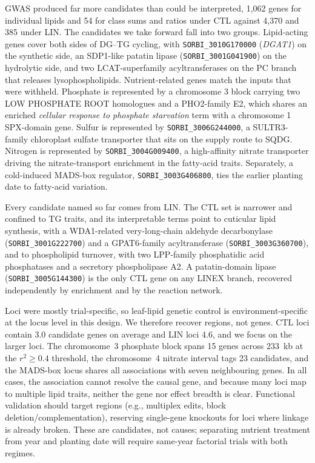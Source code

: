 \documentclass[9pt,twocolumn,twoside]{rilabRxiv}
\begin{document}
GWAS produced far more candidates than could be interpreted, 1,062 genes for individual lipids and 54 for class sums and ratios under CTL against 4,370 and 385 under LIN. The candidates we take forward fall into two groups. Lipid-acting genes cover both sides of DG--TG cycling, with \texttt{SORBI\_3010G170000} (\textit{DGAT1}) on the synthetic side, an SDP1-like patatin lipase (\texttt{SORBI\_3001G041900}) on the hydrolytic side, and two LCAT-superfamily acyltransferases on the PC branch that releases lysophospholipids. Nutrient-related genes match the inputs that were withheld. Phosphate is represented by a chromosome 3 block carrying two LOW PHOSPHATE ROOT homologues and a PHO2-family E2, which shares an enriched \textit{cellular response to phosphate starvation} term with a chromosome 1 SPX-domain gene. Sulfur is represented by \texttt{SORBI\_3006G244000}, a SULTR3-family chloroplast sulfate transporter that sits on the supply route to SQDG. Nitrogen is represented by \texttt{SORBI\_3004G009400}, a high-affinity nitrate transporter driving the nitrate-transport enrichment in the fatty-acid traits. Separately, a cold-induced MADS-box regulator, \texttt{SORBI\_3003G406800}, ties the earlier planting date to fatty-acid variation.

Every candidate named so far comes from LIN. The CTL set is narrower and confined to TG traits, and its interpretable terms point to cuticular lipid synthesis, with a WDA1-related very-long-chain aldehyde decarbonylase (\texttt{SORBI\_3001G222700}) and a GPAT6-family acyltransferase (\texttt{SORBI\_3003G360700}), and to phospholipid turnover, with two LPP-family phosphatidic acid phosphatases and a secretory phospholipase A2. A patatin-domain lipase (\texttt{SORBI\_3005G144300}) is the only CTL gene on any LINEX branch, recovered independently by enrichment and by the reaction network.

Loci were mostly trial-specific, so leaf-lipid genetic control is environment-specific at the locus level in this design. We therefore recover regions, not genes. CTL loci contain 3.0 candidate genes on average and LIN loci 4.6, and we focus on the larger loci. The chromosome~3 phosphate block spans 15 genes across 233~kb at the $r^2 \geq 0.4$ threshold, the chromosome~4 nitrate interval tags 23 candidates, and the MADS-box locus shares all associations with seven neighbouring genes. In all cases, the association cannot resolve the causal gene, and because many loci map to multiple lipid traits, neither the gene nor effect breadth is clear. Functional validation should target regions (e.g., multiplex edits, block deletion/complementation), reserving single-gene knockouts for loci where linkage is already broken. These are candidates, not causes; separating nutrient treatment from year and planting date will require same-year factorial trials with both regimes.
\end{document}
